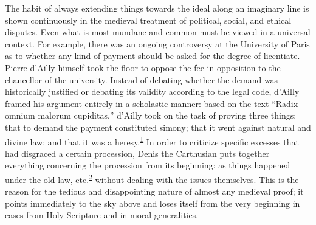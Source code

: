 The habit of always extending things towards the ideal along an
imaginary line is shown continuously in the medieval treatment of
political, social, and ethical disputes. Even what is most mundane and
common must be viewed in a universal context. For example, there was an
ongoing controversy at the University of Paris as to whether any kind of
payment should be asked for the degree of licentiate. Pierre d'Ailly
himself took the floor to oppose the fee in opposition to the chancellor
of the university. Instead of debating whether the demand was
historically justified or debating its validity according to the legal
code, d'Ailly framed his argument entirely
\protect\hypertarget{17_Chapter_Ten__THE_FAILURE_OF_IMAG.xhtmlux5cux23page_250}{}{}in
a scholastic manner: based on the text ``Radix omnium malorum
cupiditas,'' d'Ailly took on the task of proving three things: that to
demand the payment constituted simony; that it went against natural and
divine law; and that it was a
heresy.\textsuperscript{\protect\hypertarget{17_Chapter_Ten__THE_FAILURE_OF_IMAG.xhtmlux5cux23id_734}{\protect\hyperlink{23_NOTES.xhtmlux5cux23id_735}{1}}}
In order to criticize specific excesses that had disgraced a certain
procession, Denis the Carthusian puts together everything concerning the
procession from its beginning: as things happened under the old law,
etc.\textsuperscript{\protect\hypertarget{17_Chapter_Ten__THE_FAILURE_OF_IMAG.xhtmlux5cux23id_732}{\protect\hyperlink{23_NOTES.xhtmlux5cux23id_733}{2}}}
without dealing with the issues themselves. This is the reason for the
tedious and disappointing nature of almost any medieval proof; it points
immediately to the sky above and loses itself from the very beginning in
cases from Holy Scripture and in moral generalities.

